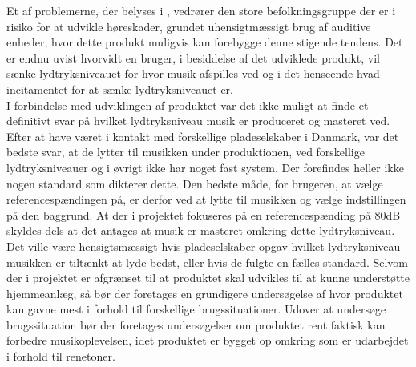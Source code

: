 Et af problemerne, der belyses i , vedrører den store befolkningsgruppe der er i risiko for at udvikle høreskader, grundet uhensigtmæssigt brug af auditive enheder, hvor dette produkt muligvis kan forebygge denne stigende tendens. Det er endnu uvist hvorvidt en bruger, i besiddelse af det udviklede produkt, vil sænke lydtryksniveauet for hvor musik afspilles ved og i det henseende hvad incitamentet for at sænke lydtryksniveauet er. \\[5mm]
%
I forbindelse med udviklingen af produktet var det ikke muligt at finde et definitivt svar på hvilket lydtryksniveau musik er produceret og masteret ved. Efter at have været i kontakt med forskellige pladeselskaber i Danmark, var det bedste svar, at de lytter til musikken under produktionen, ved forskellige lydtryksniveauer og i øvrigt ikke har noget fast system. Der forefindes heller ikke nogen standard som dikterer dette. Den bedste måde, for brugeren, at vælge referencespændingen på, er derfor ved at lytte til musikken og vælge indstillingen på den baggrund. At der i projektet fokuseres på en referencespænding på 80dB skyldes dels at det antages at musik er masteret omkring dette lydtryksniveau. Det ville være hensigtsmæssigt hvis pladeselskaber opgav hvilket lydtryksniveau musikken er tiltænkt at lyde bedst, eller hvis de fulgte en fælles standard. \blankline
%
Selvom der i projektet er afgrænset til at produktet skal udvikles til at kunne understøtte hjemmeanlæg, så bør der foretages en grundigere undersøgelse af hvor produktet kan gavne mest i forhold til forskellige brugssituationer. Udover at undersøge brugssituation bør der foretages undersøgelser om produktet rent faktisk kan forbedre musikoplevelsen, idet produktet er bygget op omkring \textcite{STD:ISO226} som er udarbejdet i forhold til renetoner.  
%
